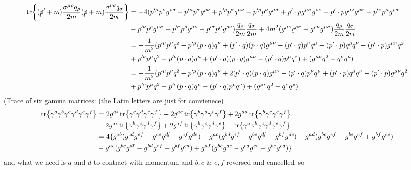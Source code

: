 \documentclass{article}
\newcommand{\s}{\sigma} \renewcommand{\G}{\Gamma}
\renewcommand{\G}{\Gamma}
\begin{document}
\begin{align*}
  \tr{(\ps'+m)\frac{\s^{\mu\rho}q_{\rho}}{2m}(\ps+m)\frac{\s^{\nu\s}q_{\s}}{2m}}&=-4(p'^{\mu}p^{\nu}g^{{\rho}{\s}}-p'^{\mu}p^{\s}g^{{\rho}{\nu}}+p'^{\rho}p^{\s}g^{{\mu}{\nu}}-p'^{\rho}p^{\nu}g^{{\mu}{\s}}+p'\cdot pg^{{\mu}{\s}}g^{{\rho}{\nu}}-p'\cdot pg^{{\mu}{\nu}}g^{{\rho}{\s}}+p'^{\nu}p^{\mu}g^{{\rho}{\s}}\\
  &-p'^{\nu}p^{\rho}g^{{\mu}{\s}}+p'^{\s}p^{\rho}g^{{\mu}{\nu}}-p'^{\s}p^{\mu}g^{{\rho}{\nu}})\frac{q_{\rho}}{2m}\frac{q_{\s}}{2m}+4m^2(g^{\mu\nu}g^{\rho\s}-g^{\rho\nu}g^{\mu\s})\frac{q_{\rho}}{2m}\frac{q_{\s}}{2m}\\
  &=-\frac{1}{m^2}(p'^{\mu}p^{\nu}q^2-p'^{\mu}(p\cdot q)q^{\nu}+(p'\cdot q)(p\cdot q)g^{{\mu}{\nu}}-(p'\cdot q)p^{\nu}q^{\mu}+(p'\cdot p)q^{\mu}q^{\nu}-(p'\cdot p)g^{{\mu}{\nu}}q^2\\&+p'^{\nu}p^{\mu}q^2-p'^{\nu}(p\cdot q)q^{\mu}+(p'\cdot q)(p\cdot q)g^{{\mu}{\nu}}-(p'\cdot q)p^{\mu}q^{\nu})+(g^{\mu\nu}q^2-q^{\nu}q^{\mu})\\
  &=-\frac{1}{m^2}(p'^{\mu}p^{\nu}q^2-p'^{\mu}(p\cdot q)q^{\nu}+2(p'\cdot q)(p\cdot q)g^{{\mu}{\nu}}-(p'\cdot q)p^{\nu}q^{\mu}+(p'\cdot p)q^{\mu}q^{\nu}-(p'\cdot p)g^{{\mu}{\nu}}q^2\\&+p'^{\nu}p^{\mu}q^2-p'^{\nu}(p\cdot q)q^{\mu}-(p'\cdot q)p^{\mu}q^{\nu})+(g^{\mu\nu}q^2-q^{\nu}q^{\mu})
\end{align*}
(Trace of six gamma matrices: (the Latin letters are just for convienece)
\begin{align*}
  \tr{\gamma^a\gamma^b\gamma^c\gamma^d\gamma^e\gamma^f}&=2g^{ab}\tr{\gamma^c\gamma^d\gamma^e\gamma^f}-2g^{ac}\tr{\gamma^b\gamma^d\gamma^e\gamma^f}+2g^{ad}\tr{\gamma^b\gamma^c\gamma^e\gamma^f}\\&-2g^{ae}\tr{\gamma^b\gamma^c\gamma^d\gamma^f}+2g^{af}\tr{\gamma^b\gamma^c\gamma^d\gamma^e}-\tr{\gamma^a\gamma^b\gamma^c\gamma^d\gamma^e\gamma^f}\\
  &=4\{g^{ab}(g^{cd}g^{ef}-g^{ce}g^{df}+g^{cf}g^{de})-g^{ac}(g^{bd}g^{ef}-g^{be}g^{df}+g^{bf}g^{de})+g^{ad}(g^{bc}g^{ef}-g^{be}g^{cf}+g^{bf}g^{ce})\\&-g^{ae}(g^{bc}g^{df}-g^{bd}g^{cf}+g^{bf}g^{cd})+g^{af}(g^{bc}g^{de}-g^{bd}g^{ce}+g^{be}g^{cd})\}
\end{align*}
and what we need is $a$ and $d$ to contract with momentum and $b,c$ \& $e,f$ reversed and cancelled, so
\end{document}
